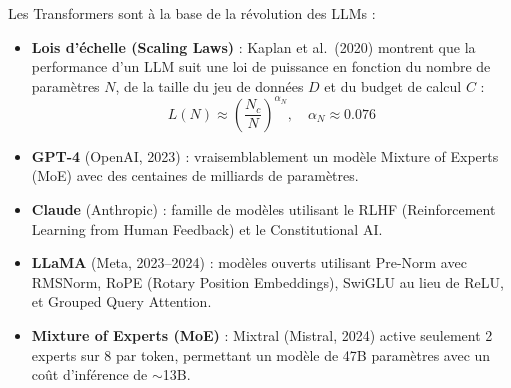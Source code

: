 \begin{sota}[title=\textbf{Grands mod\`eles de langage (LLMs)}]
Les Transformers sont \`a la base de la r\'evolution des LLMs :

\begin{itemize}
    \item \textbf{Lois d'\'echelle (Scaling Laws)} : Kaplan et al.\ (2020) montrent que la performance d'un LLM suit une loi de puissance en fonction du nombre de param\`etres $N$, de la taille du jeu de donn\'ees $D$ et du budget de calcul $C$ :
    \begin{equation}
    L(N) \approx \left(\frac{N_c}{N}\right)^{\alpha_N}, \quad \alpha_N \approx 0.076
    \end{equation}

    \item \textbf{GPT-4} (OpenAI, 2023) : vraisemblablement un mod\`ele Mixture of Experts (MoE) avec des centaines de milliards de param\`etres.

    \item \textbf{Claude} (Anthropic) : famille de mod\`eles utilisant le RLHF (Reinforcement Learning from Human Feedback) et le Constitutional AI.

    \item \textbf{LLaMA} (Meta, 2023--2024) : mod\`eles ouverts utilisant Pre-Norm avec RMSNorm, RoPE (Rotary Position Embeddings), SwiGLU au lieu de ReLU, et Grouped Query Attention.

    \item \textbf{Mixture of Experts (MoE)} : Mixtral (Mistral, 2024) active seulement 2 experts sur 8 par token, permettant un mod\`ele de 47B param\`etres avec un co\^ut d'inf\'erence de $\sim$13B.
\end{itemize}
\end{sota}

